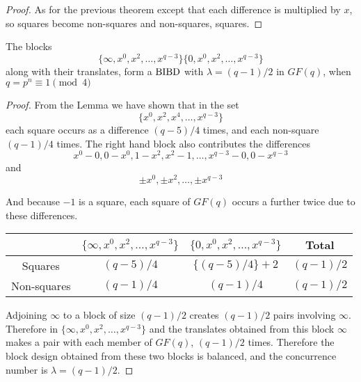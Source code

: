 \begin{proof}
As for the previous theorem except that each difference is multiplied by $x$, so squares become non-squares and non-squares, squares.
\end{proof}

\begin{theorem}
The blocks
\begin{equation}
\{\infty, x^0, x^2, \ldots, x^{q - 3}\}\{0, x^0, x^2, \ldots, x^{q - 3}\}
\end{equation}
along with their translates, form a $\operatorname{BIBD}$ with
$\lambda = (q - 1)/2$ in $GF(q)$, when
$q = p^n \equiv 1\pmod 4$
\end{theorem}

\begin{proof}
From the Lemma we have shown that in the set
\begin{equation}
\{x^0, x^2, x^4, \ldots, x^{q - 3}\}
\end{equation}
each square occurs as a difference $(q - 5)/4$ times, and each non-square $(q-1)/4$ times.
The right hand block also contributes the differences
\begin{equation}
x^0 - 0, 0 - x^0, 1 - x^2, x^2 - 1, \ldots, x^{q - 3} - 0, 0 - x^{q - 3}
\end{equation}
and
\begin{equation}
\pm x^0, \pm x^2, \ldots ,\pm x^{q - 3}
\end{equation}

And because $-1$ is a square, each square of $GF(q)$ occurs a further twice due to these differences.

\begin{center}
\begin{tabular}{c|ccc}
               & $\{\infty, x^0, x^2, \ldots, x^{q - 3}\}$ & $\{0, x^0, x^2, \ldots,x^{q - 3}\}$ &   Total     \\ \hline
     Squares   &               $(q - 5)/4$                 &         $\{(q - 5)/4\} + 2$         & $(q - 1)/2$ \\
   Non-squares &               $(q - 1)/4$                 &              $(q - 1)/4$            & $(q - 1)/2$ \\
\end{tabular}
\end{center}

Adjoining $\infty$ to a block of size $(q - 1)/2$ creates $(q - 1)/2$ pairs involving $\infty$.
Therefore in $\{\infty, x^0, x^2, \ldots, x^{q - 3}\}$ and the translates obtained from this block $\infty$ makes a pair with each member of $GF(q)$, $(q - 1)/2$ times.
Therefore the block design obtained from these two blocks is balanced, and the concurrence number is $\lambda = (q - 1)/2$.
\end{proof}

